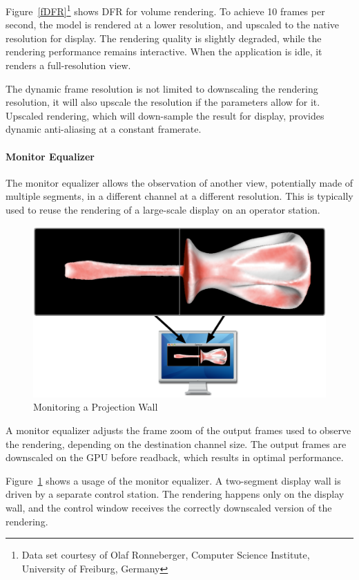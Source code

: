 \documentclass[10pt,a4]{scrartcl}
\newcommand{\fig}[1]{Figure~\ref{#1}}
\begin{document}
\fig{fDFR}\footnote{Data set courtesy of Olaf Ronneberger, Computer
  Science Institute, University of Freiburg, Germany} shows DFR for
volume rendering. To achieve 10 frames per second, the model is rendered
at a lower resolution, and upscaled to the native resolution for
display. The rendering quality is slightly degraded, while the rendering
performance remains interactive. When the application is idle, it
renders a full-resolution view.

The dynamic frame resolution is not limited to downscaling the
rendering resolution, it will also upscale the resolution if the
parameters allow for it. Upscaled rendering, which will down-sample the
result for display, provides dynamic anti-aliasing at a constant
framerate.

\paragraph{Monitor Equalizer}
The monitor equalizer allows the observation of another view,
potentially made of multiple segments, in a different channel at a
different resolution. This is typically used to reuse the rendering of
a large-scale display on an operator station.

\begin{figure}
  \includegraphics[width=.618\textwidth]{images/monitorEq.pdf}
  {\caption{\label{fMonitorEq}Monitoring a Projection Wall}}
\end{figure}
A monitor equalizer adjusts the frame zoom of the output frames used to
observe the rendering, depending on the destination channel size. The
output frames are downscaled on the GPU before readback, which results
in optimal performance.

\fig{fMonitorEq} shows a usage of the monitor equalizer. A two-segment
display wall is driven by a separate control station. The rendering
happens only on the display wall, and the control window receives the
correctly downscaled version of the rendering.
\end{document}
